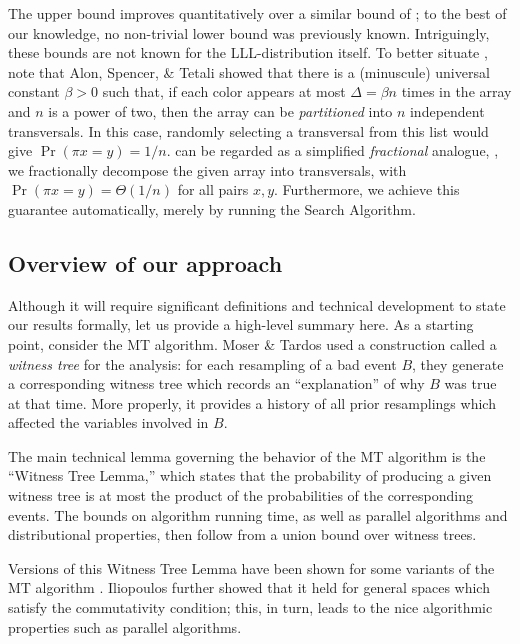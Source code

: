 \documentclass{toc}
\begin{document}
The upper bound improves quantitatively over a similar bound of \cite{NewBoundsHarris}; to the best of our knowledge, no non-trivial lower bound was previously known. Intriguingly, these bounds are not known  for the LLL-distribution itself.  To better situate , note that Alon, Spencer, \& Tetali \cite{alon1995covering} showed that there is a (minuscule) universal constant $\beta > 0$ such that, if each color appears at most $\Delta = \beta n$ times in the array and $n$ is a power of two, then the array can be \emph{partitioned} into $n$ independent transversals. In this case, randomly selecting  a transversal from this list would give  $\Pr( \pi x = y) = 1/n$.  can be regarded as a simplified \emph{fractional} analogue, \ie, we fractionally decompose the given array into  transversals, with $\Pr( \pi x = y) = \Theta(1/n)$ for all pairs $x,y$. Furthermore, we achieve this guarantee automatically, merely by running the Search Algorithm. 


\subsection{Overview of our approach}

Although it will require significant definitions and technical development to state our results formally, let us provide a high-level summary here. As a starting point, consider the MT algorithm. Moser \& Tardos \cite{MT} used a construction called a \emph{witness tree} for the analysis: for each resampling of a 
%
bad event %
 $B$, they generate a corresponding witness tree which records an ``explanation'' of why $B$ was true at that time. More properly, it provides a history of all prior resamplings which affected the variables involved in $B$.  

The main technical lemma governing the behavior of the MT algorithm is the ``Witness Tree Lemma,'' which states that the probability of producing a given witness tree is at most the product of the probabilities of the corresponding events.
%
%
The bounds on
%
%
algorithm running time,  %
as well as parallel algorithms and distributional properties, then follow from a union bound over witness trees. 

Versions of this Witness Tree Lemma have been shown for some variants of the MT algorithm \cite{LLLLBeyond, PartResmp1}. Iliopoulos \cite{LLLWTL} further showed that it held for general spaces which satisfy the commutativity %
condition;  %
this, in turn, leads to the nice algorithmic properties such as parallel algorithms.
\end{document}
